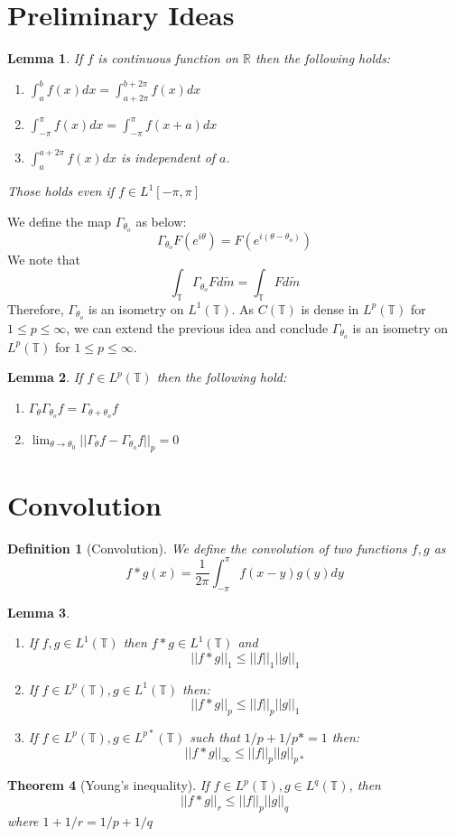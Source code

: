 \documentclass{article}
\newtheorem{theorem}{Theorem}[]
\newtheorem{definition}{Definition}[]
\newtheorem{lemma}[theorem]{Lemma}
\begin{document}
\section{Preliminary Ideas}
\begin{lemma}
	If $f$ is continuous function on $\mathbb{R}$ then the following holds:
	\begin{enumerate}
		\item $\int_a^bf(x)dx=\int_{a+2\pi}^{b+2\pi}f(x)dx$
		\item $\int_{-\pi}^\pi f(x)dx=\int_{-\pi}^\pi f(x+a)dx$
		\item $\int_a^{a+2\pi}f(x)dx$ is independent of $a$.
	\end{enumerate}
	Those holds even if $f\in L^1[-\pi,\pi]$ 
\end{lemma}\noindent
We define the map $\Gamma_{\theta_o}$ as below:
$$\Gamma_{\theta_o}F(e^{i\theta})=F(e^{i(\theta-\theta_o)})$$ 
We note that 
$$\int_\mathbb{T}\Gamma_{\theta_o}Fd\tilde{m}=\int_\mathbb{T}Fd\tilde{m}$$
Therefore, $\Gamma_{\theta_o}$ is an isometry on $L^1(\mathbb{T})$. As $C(\mathbb{T})$ is dense in $L^p(\mathbb{T})$ for $1\leq p\leq \infty$, we can extend the previous idea and conclude $\Gamma_{\theta_o}$ is an isometry on $L^p(\mathbb{T})$ for $1\leq p\leq \infty$.
\begin{lemma}
If $f\in L^p(\mathbb{T})$ then the following hold:
\begin{enumerate}
	\item $\Gamma_\theta\Gamma_{\theta_o}f=\Gamma_{\theta+\theta_o}f$
	\item $\lim_{\theta\to\theta_0}||\Gamma_\theta f-\Gamma_{\theta_o}f||_p=0$
\end{enumerate}
\end{lemma}
\section{Convolution}
\begin{definition}[Convolution]
We define the convolution of two functions $f,g$ as 
$$f*g(x)=\frac{1}{2\pi}\int_{-\pi}^\pi f(x-y)g(y)dy$$
\end{definition}
\begin{lemma}
	\begin{enumerate}
		\item If $f,g\in L^1(\mathbb{T})$ then $f*g\in L^1(\mathbb{T})$ and $$||f*g||_1\leq ||f||_1||g||_1$$
		\item If $f\in L^p(\mathbb{T}),g\in L^1(\mathbb{T})$ then:
		$$||f*g||_p\leq ||f||_p||g||_1$$
		\item If $f\in L^p(\mathbb{T}),g\in L^{p*}(\mathbb{T})$ such that $1/p+1/p*=1$ then:
		$$||f*g||_\infty\leq ||f||_p||g||_{p*}$$
	\end{enumerate}
\end{lemma}
\begin{theorem}[Young's inequality]
If 	$f\in L^p(\mathbb{T}),g\in L^q(\mathbb{T})$, then 
$$||f*g||_r\leq ||f||_p||g||_{q}$$
where $1+1/r=1/p+1/q$
\end{theorem}
\end{document}
